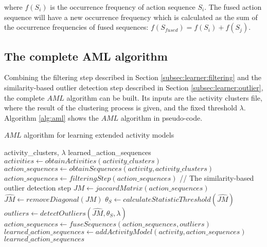 \noindent where $f(S_i)$ is the occurrence frequency of action sequence $S_i$. The fused action sequence will have a new occurrence frequency which is calculated as the sum of the occurrence frequencies of fused sequences: $f(S_{fused}) = f(S_i) + f(S_j)$. 

\subsection{The complete AML algorithm}
\label{subsec:learner:complete}

Combining the filtering step described in Section \ref{subsec:learner:filtering} and the similarity-based outlier detection step described in Section \ref{subsec:learner:outlier}, the complete $AML$ algorithm can be built. Its inputs are the activity clusters file, where the result of the clustering process is given, and the fixed threshold $\lambda$. Algorithm \ref{alg:aml} shows the $AML$ algorithm in pseudo-code.  

\begin{algorithm}
 \caption{$AML$ algorithm for learning extended activity models}
 \label{alg:aml}
 \begin{algorithmic}
 \REQUIRE activity\_clusters, $\lambda$
 \ENSURE learned\_action\_sequences
 \STATE $activities \leftarrow obtainActivities(activity\_clusters)$
   \STATE $action\_sequences \leftarrow obtainSequences(activity, activity\_clusters)$
   \STATE $action\_sequences \leftarrow filteringStep(action\_sequences)$
   \STATE // The similarity-based outlier detection step
   \REPEAT
     \STATE $JM \leftarrow jaccardMatrix(action\_sequences)$
     \STATE $\hat{JM} \leftarrow removeDiagonal(JM)$
     \STATE $\theta_S \leftarrow calculateStatisticThreshold(\hat{JM})$
     \STATE $outliers \leftarrow detectOutliers(\hat{JM}, \theta_S, \lambda)$
     \STATE $action\_sequences \leftarrow fuseSequences(action\_sequences, outliers)$
   \STATE $learned\_action\_sequences \leftarrow addActivityModel(activity, action\_sequences)$
 \ENDFOR
 \RETURN $learned\_action\_sequences$ 
 \end{algorithmic}
\end{algorithm}

